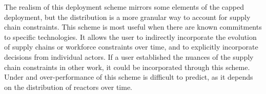 The realism of this deployment scheme mirrors some elements of the capped
deployment, but the distribution is a more granular way to account for supply
chain constraints. This scheme is most useful when there are known commitments
to specific technologies. It allows the user to indirectly incorporate the
evolution of supply chains or workforce constraints over time, and to
explicitly incorporate decisions from individual actors. If a user established
the nuances of the supply chain constraints in other work, it could be
incorporated through this scheme. Under and over-performance of this scheme is
difficult to predict, as it depends on the distribution of reactors over time.